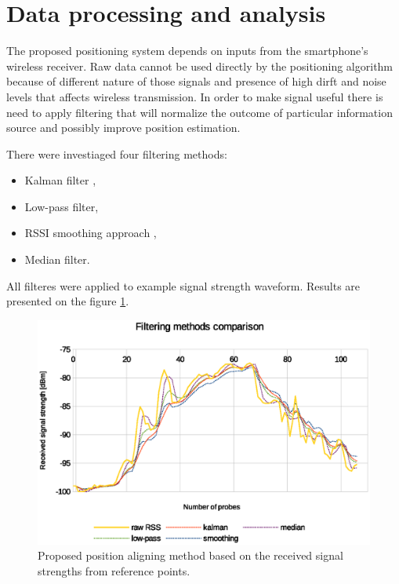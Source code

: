 \documentclass[../main.tex]{subfiles}
\begin{document}

\section{Data processing and analysis} %
\label{sec:data_processing}

The proposed positioning system depends on inputs from the smartphone's wireless receiver. Raw data cannot be used directly by the positioning algorithm because of different nature of those signals and presence of high dirft and noise levels that affects wireless transmission. In order to make signal useful there is need to apply filtering that will normalize the outcome of particular information source and possibly improve position estimation.

There were investiaged four filtering methods:
\begin{itemize}
	\item Kalman filter \cite{article_rss_kalman},
	\item Low-pass filter,
	\item RSSI smoothing approach \cite{rssi_smoothing},
	\item Median filter.
\end{itemize}

All filteres were applied to example signal strength waveform. Results are presented on the figure \ref{fig:filtering_comparison}.

\begin{figure}[!htbp]
\includegraphics[width=\textwidth]{pictures/filtering_comparison}
\centering
\caption{Proposed position aligning method based on the received signal strengths from reference points.}
\label{fig:filtering_comparison}
\end{figure}
\end{document}
